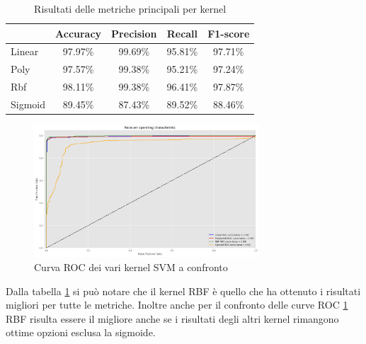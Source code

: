 \begin{table}[!ht]
    \centering
    \begin{tabular}{@{}lcccc@{}}
        \toprule
        \rowcolor[HTML]{EFEFEF}
        \multicolumn{1}{c}{\cellcolor[HTML]{EFEFEF}\textbf{kernel}} & \textbf{Accuracy} & \textbf{Precision} & \textbf{Recall} & \textbf{F1-score} \\ \midrule
        Linear                                                      & 97.97\%           & 99.69\%            & 95.81\%         & 97.71\%           \\
        Poly                                                        & 97.57\%           & 99.38\%            & 95.21\%         & 97.24\%           \\
        Rbf                                                         & 98.11\%           & 99.38\%            & 96.41\%         & 97.87\%           \\
        Sigmoid                                                     & 89.45\%           & 87.43\%            & 89.52\%         & 88.46\%           \\ \bottomrule
    \end{tabular}
    \caption{Risultati delle metriche principali per kernel}
    \label{tab:top_metrics_kernels_corr}
\end{table}
\begin{figure}[!ht]
    \centering
    \includegraphics[width=0.75\textwidth]{img/svm/roc_SVM.png}
    \caption{Curva ROC dei vari kernel SVM a confronto}
    \label{fig:roc_SVM_corr}
\end{figure}
\newpage

Dalla tabella \ref{tab:top_metrics_kernels_corr} si può notare che il kernel RBF
è quello che ha ottenuto i risultati migliori per tutte le metriche. Inoltre anche
per il confronto delle curve ROC \ref{fig:roc_SVM_corr} RBF risulta essere il
migliore anche se i risultati degli altri kernel rimangono ottime opzioni esclusa
la sigmoide.

